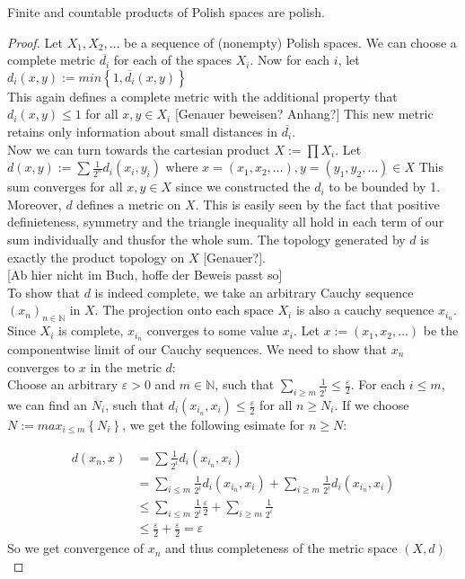 \documentclass[10pt, a4paper, titlepage]{article}
\numberwithin{equation}{section}
\begin{document}
\begin{lemma}
	Finite and countable products of Polish spaces are polish.
\end{lemma}
\begin{proof}
	Let $X_1,X_2,\ldots$ be a sequence of (nonempty) Polish spaces. We can choose a complete metric $\overline{d_i}$ for each of the spaces $X_i$. 
	Now for each $i$, let $d_i \left( x,y \right) := min \left\{ 1,\overline{d_i} \left( x,y \right)  \right\}$\\
	This again defines a complete metric with the additional property that $d_i\left( x,y \right) \leq 1$ for all $x,y \in X_i$ [Genauer beweisen? Anhang?]
This new metric retains only information about small distances in $\overline{d_i}$.\\
Now we can turn towards the cartesian product $X := \prod X_i$.
Let $d\left( x,y \right):= \sum \frac{1}{2^{n}} d_i\left( x_{i},y_{i} \right)$
where $x = \left( x_1,x_2,\ldots \right), y = \left( y_1,y_2,\ldots \right) \in X$ 
This sum converges for all $x,y \in X$ since we constructed the $d_i$ to be bounded by 1.
 Moreover, $d$ defines a metric on $X$. This is easily seen by the fact that positive definieteness, symmetry and the triangle inequality all hold in each term of our sum individually and thusfor the whole sum. 
 The topology generated by $d$ is exactly the product topology on $X$ [Genauer?].\\

[Ab hier nicht im Buch, hoffe der Beweis passt so] \\
To show that $d$ is indeed complete, we take an arbitrary Cauchy sequence $(x_{n})_{n \in  \mathbb{N}}$ in $X$. The projection onto each  space $X_i$ is also a cauchy sequence  $x_{i_n}$.
 Since $X_i$ is complete, $x_{i_n}$ converges to some value $x_i$. 
Let $x:= \left( x_1,x_2,\ldots \right) $ be the componentwise limit of our Cauchy sequences. We need to show that $x_{n}$ converges to $x$ in the metric $d$:\\
Choose an arbitrary $\varepsilon > 0 $ and $m \in  \mathbb{N}$, such that $\sum_{i \geq m} \frac{1}{2^i} \leq \frac{\varepsilon}{2} $.
For each $i \leq m$, we can find an  $N_i$, such that $d_i\left( x_{i_n},x_i \right) \leq \frac{\varepsilon}{2}$ for all $n\geq N_i$. 
If we choose $N := max_{i \leq m}\left\{ N_i \right\} $, we get the following esimate for $n \geq N$: 

\begin{align*}
	d\left( x_{n},x \right) &= \sum \frac{1}{2^i} d_i\left( x_{i_n},x_i \right)\\
				&= \sum_{i\leq m} \frac{1}{2^i} d_i\left( x_{i_n},x_i \right) + \sum_{i \geq m} \frac{1}{2^i} d_i\left( x_{i_n},x_i \right) \\
				&\leq \sum_{i \leq m} \frac{1}{2^i} \frac{\varepsilon}{2} + \sum_{i\geq m} \frac{1}{2^i} \\
				&\leq \frac{\varepsilon}{2} + \frac{\varepsilon}{2} = \varepsilon
\end{align*}
So we get convergence of $x_n$ and thus completeness of the metric space $\left( X,d \right) $ \\


\end{proof}
\end{document}
